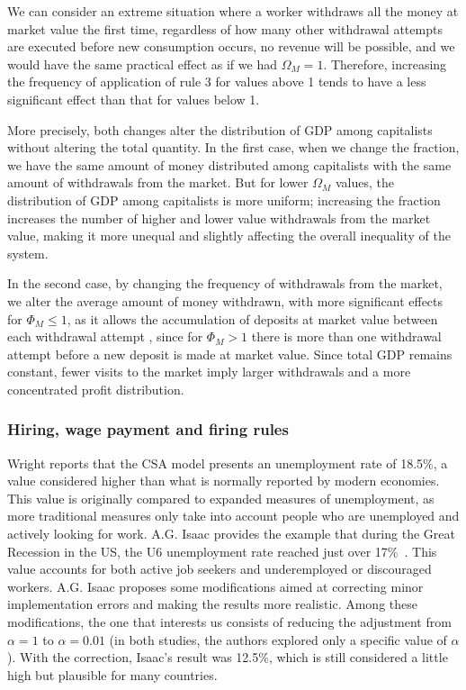We can consider an extreme situation where a worker withdraws all the money at market value the first time, regardless of how many other withdrawal attempts are executed before new consumption occurs, no revenue will be possible, and we would have the same practical effect as if we had $\Omega_M=1$. Therefore, increasing the frequency of application of rule 3 for values above 1 tends to have a less significant effect than that for values below 1.
 
More precisely, both changes alter the distribution of GDP among capitalists without altering the total quantity. In the first case,  when we change the fraction, we have the same amount of money distributed among capitalists with the same amount of withdrawals from the market. But for lower $\Omega_M$ values, the distribution of GDP among capitalists is more uniform; increasing the fraction increases the number of higher and lower value withdrawals from the market value, making it more unequal and slightly affecting the overall inequality of the system. 

In the second case, by changing the frequency of withdrawals from the market, we alter the average amount of money withdrawn, with more significant effects for $\Phi_M \le 1$, as it allows the accumulation of deposits at market value between each withdrawal attempt , since for $\Phi_M>1$ there is more than one withdrawal attempt before a new deposit is made at market value. Since total GDP remains constant, fewer visits to the market imply larger withdrawals and a more concentrated profit distribution. 


\subsubsection*{Hiring, wage payment and firing rules} 
\label{sec:hiring}

Wright reports that the CSA model presents an unemployment rate of 18.5\%, a value considered higher than what is normally reported by modern economies. This value is originally compared to expanded measures of unemployment, as more traditional measures only take into account people who are unemployed and actively looking for work. A.G. Isaac provides the example that during the Great Recession in the US, the U6 unemployment rate reached just over 17\%~\cite{ISAAC2019}.  
This value accounts for both active job seekers and underemployed or discouraged workers. 
%
A.G. Isaac proposes some modifications aimed at correcting minor implementation errors and making the results more realistic. Among these modifications, the one that interests us consists of reducing the adjustment from $\alpha=1$ to $\alpha=0.01$ (in both studies, the authors explored only a specific value of $\alpha$). With the correction, Isaac's result was 12.5\%, which is still considered a little high but plausible for many countries. 


